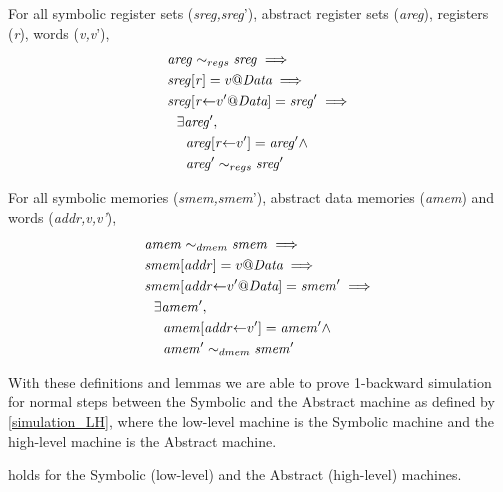 \begin{lemma}
\label{refine_registers_upd}
For all symbolic register sets (\textit{sreg,sreg}'),
abstract register sets (\textit{areg}), registers (\textit{r}),
words (\textit{v,v}'),
\begin{align*}
  & \mathit{areg} \sim_{regs} \mathit{sreg} \implies \\
  & \mathit{sreg}[\mathit{r}] = v@\textit{Data} \implies \\
  & \mathit{sreg}[\mathit{r}{\leftarrow}v'@\textit{Data}] = \mathit{sreg'} \implies \\
  & ~~ \exists \mathit{areg'}, \\
  & ~~~~ \mathit{areg}[\mathit{r}{\leftarrow}v'] = \mathit{areg'} \land \\
  & ~~~~  \mathit{areg'} \sim_{regs} \mathit{sreg'}
\end{align*}
\end{lemma}

\begin{lemma}
\label{refine_memory_upd}
For all symbolic memories (\textit{smem,smem}'),
abstract data memories (\textit{amem}) and
words (\textit{addr,v,v'}),
\begin{align*}
  & \mathit{amem} \sim_{dmem} \mathit{smem} \implies \\
  & \mathit{smem}[\mathit{addr}] = v@\textit{Data} \implies \\
  & \mathit{smem}[\mathit{addr}{\leftarrow}v'@\textit{Data}] = \mathit{smem'} \implies \\
  & ~~ \exists \mathit{amem'}, \\
  & ~~~~ \mathit{amem}[\mathit{addr}{\leftarrow}v'] = \mathit{amem'} \land \\
  & ~~~~  \mathit{amem'} \sim_{dmem} \mathit{smem'}
\end{align*}
\end{lemma}

With these definitions and lemmas we are able to prove 1-backward simulation
for normal steps between the Symbolic and the Abstract machine as defined
by \cref{simulation_LH}, where the low-level machine is the Symbolic machine and
the high-level machine is the Abstract machine.

\begin{theorem}
\label{simulation_SA}
 holds for the Symbolic (low-level) and
the Abstract (high-level) machines.
\end{theorem}

